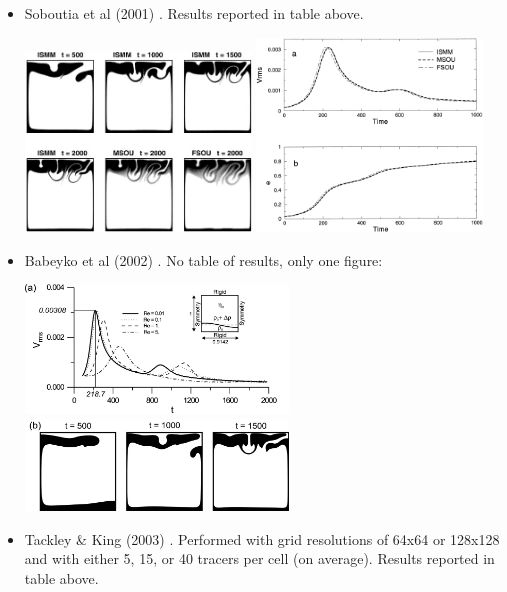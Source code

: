 \begin{itemize}
\item Soboutia et al (2001) \cite{soga01}. Results reported in table above.
\begin{center}
\includegraphics[width=6cm]{images/benchmark_vaks97/soga01a}
\includegraphics[width=6cm]{images/benchmark_vaks97/soga01b}
\end{center}

\item Babeyko et al (2002) \cite{bast02}. No table of results, only one figure:
\begin{center}
\includegraphics[width=7cm]{images/benchmark_vaks97/bast02_a}
\includegraphics[width=7cm]{images/benchmark_vaks97/bast02_b}
\end{center}

\item Tackley \& King (2003) \cite{taki03}. Performed with grid resolutions of 
64x64 or 128x128 and with either 5, 15, or 40 tracers per cell (on average). 
Results reported in table above. 


\end{itemize}
